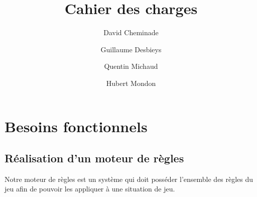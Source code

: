 \documentclass[12pt]{article}
\title{Cahier des charges}
\author{
	David Cheminade
	\and
	Guillaume Desbieys
	\and
	Quentin Michaud
	\and
	Hubert Mondon
}
\date{}
\begin{document}
 
	\maketitle{}                             

	\section{Besoins fonctionnels}    

		\subsection{Réalisation d'un moteur de règles}

			Notre moteur de règles est un système qui doit posséder l'ensemble des règles du jeu afin de pouvoir les appliquer à une situation de jeu.
\end{document}
